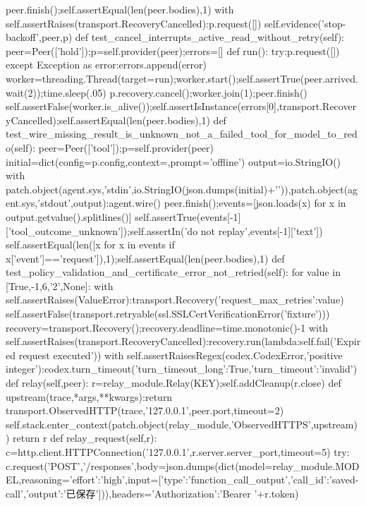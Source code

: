 {        peer.finish();self.assertEqual(len(peer.bodies),1)
        with self.assertRaises(transport.RecoveryCancelled):p.request([])
        self.evidence('stop-backoff',peer,p)
    def test_cancel_interrupts_active_read_without_retry(self):
        peer=Peer(['hold']);p=self.provider(peer);errors=[]
        def run():
            try:p.request([])
            except Exception as error:errors.append(error)
        worker=threading.Thread(target=run);worker.start();self.assertTrue(peer.arrived.wait(2));time.sleep(.05)
        p.recovery.cancel();worker.join(1);peer.finish()
        self.assertFalse(worker.is_alive());self.assertIsInstance(errors[0],transport.RecoveryCancelled);self.assertEqual(len(peer.bodies),1)
    def test_wire_missing_result_is_unknown_not_a_failed_tool_for_model_to_redo(self):
        peer=Peer(['tool']);p=self.provider(peer)
        initial=dict(config=p.config,context={},prompt='offline')
        output=io.StringIO()
        with patch.object(agent.sys,'stdin',io.StringIO(json.dumps(initial)+'\n')),patch.object(agent.sys,'stdout',output):agent.wire()
        peer.finish();events=[json.loads(x) for x in output.getvalue().splitlines()]
        self.assertTrue(events[-1]['tool_outcome_unknown']);self.assertIn('do not replay',events[-1]['text'])
        self.assertEqual(len([x for x in events if x['event']=='request']),1);self.assertEqual(len(peer.bodies),1)
    def test_policy_validation_and_certificate_error_not_retried(self):
        for value in [True,-1,6,'2',None]:
            with self.assertRaises(ValueError):transport.Recovery({'request_max_retries':value})
        self.assertFalse(transport.retryable(ssl.SSLCertVerificationError('fixture')))
        recovery=transport.Recovery();recovery.deadline=time.monotonic()-1
        with self.assertRaises(transport.RecoveryCancelled):recovery.run(lambda:self.fail('Expired request executed'))
        with self.assertRaisesRegex(codex.CodexError,'positive integer'):codex.turn_timeout({'turn_timeout_long':True,'turn_timeout':'invalid'})
    def relay(self,peer):
        r=relay_module.Relay(KEY);self.addCleanup(r.close)
        def upstream(trace,*args,**kwargs):return transport.ObservedHTTP(trace,'127.0.0.1',peer.port,timeout=2)
        self.stack.enter_context(patch.object(relay_module,'ObservedHTTPS',upstream))
        return r
    def relay_request(self,r):
        c=http.client.HTTPConnection('127.0.0.1',r.server.server_port,timeout=5)
        try:
            c.request('POST','/responses',body=json.dumps(dict(model=relay_module.MODEL,reasoning={'effort':'high'},input=[{'type':'function_call_output','call_id':'saved-call','output':'已保存'}])),headers={'Authorization':'Bearer '+r.token})
}

